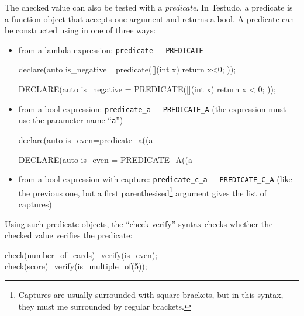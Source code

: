 \documentclass[twoside, a4paper, article]{memoir}
\newcommand*\testudocolor{\color{red!80!blue}}
\newcommand*\testudo[1]{\texttt{\testudocolor{}#1}}
\newcommand*\testudopair[2]{\testudo{#1}~--~\testudo{#2}}
\begin{document}
The checked value can also be tested with a \emph{predicate}.  In Testudo, a
predicate is a function object that accepts one argument and returns a
bool.  A predicate can be constructed using in one of three ways:
\begin{itemize}
\item from a lambda expression: \testudopair{predicate}{PREDICATE}
\begin{cpplisting}
declare(auto is_negative=
        predicate([](int x) { return x<0; }));
\end{cpplisting}

\begin{cpplisting}
DECLARE(auto is_negative =
        PREDICATE([](int x) { return x < 0; }));
\end{cpplisting}

\item from a bool expression:
  \testudopair{predicate\_a}{PREDICATE\_A} (the expression must use the
  parameter name ``\texttt{a}'')
\begin{cpplisting}
declare(auto is_even=predicate_a((a%
\end{cpplisting}

\begin{cpplisting}
DECLARE(auto is_even = PREDICATE_A((a %
\end{cpplisting}

\item from a bool expression with capture:
  \testudopair{predicate\_c\_a}{PREDICATE\_C\_A} (like the previous one, but a
  first parenthesised\footnote{Captures are usually surrounded with square
    brackets, but in this syntax, they must me surrounded by regular brackets.}
  argument gives the list of captures)

\end{itemize}

Using such predicate objects, the ``check-verify'' syntax checks whether the
checked value verifies the predicate:
\begin{cpplisting}
check(number_of_cards)_verify(is_even);
check(score)_verify(is_multiple_of(5));
\end{cpplisting}
\end{document}
